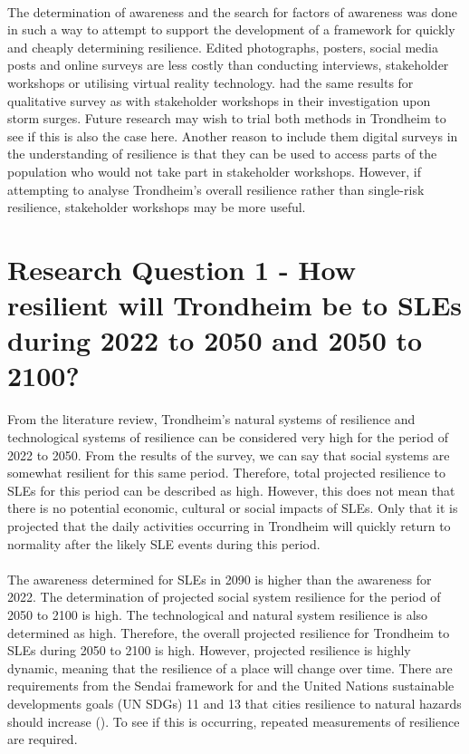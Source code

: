 \paragraph{}
The determination of awareness and the search for factors of awareness was done in such a way to attempt to support the development of a framework for quickly and cheaply determining resilience. Edited photographs, posters, social media posts and online surveys are less costly than conducting interviews, stakeholder workshops or utilising virtual reality technology. \cite{gerkensmeier_governing_2018} had the same results for qualitative survey as with stakeholder workshops in their investigation upon storm surges. Future research may wish to trial both methods in Trondheim to see if this is also the case here. Another reason to include them digital surveys in the understanding of resilience is that they can be used to access parts of the population who would not take part in stakeholder workshops. However, if attempting to analyse Trondheim's overall resilience rather than single-risk resilience, stakeholder workshops may be more useful.


\section{Research Question 1 - How resilient will Trondheim be to SLEs during 2022 to 2050 and 2050 to 2100? } \label{RQ1-findings}
From the literature review, Trondheim's natural systems of resilience and technological systems of resilience can be considered very high for the period of 2022 to 2050. From the results of the survey,  we can say that social systems are somewhat resilient for this same period. Therefore, total projected resilience to SLEs for this period can be described as high. However, this does not mean that there is no potential economic, cultural or social impacts of SLEs. Only that it is projected that the daily activities occurring in Trondheim will quickly return to normality after the likely SLE events during this period.
\paragraph{}
The awareness determined for SLEs in 2090 is higher than the awareness for 2022. The determination of projected social system resilience for the period of 2050 to 2100 is high. The technological and natural system resilience is also determined as high. Therefore, the overall projected resilience for Trondheim to SLEs during 2050 to 2100 is high. However, projected resilience is highly dynamic, meaning that the resilience of a place will change over time. There are requirements from the Sendai framework for and the United Nations sustainable developments goals (UN SDGs) 11 and 13 that cities resilience to natural hazards should increase (\cite{gonzalez-riancho_storm_2017}). To see if this is occurring, repeated measurements of resilience are required. 

